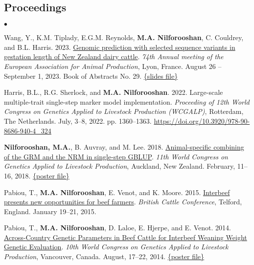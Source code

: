 \documentclass[margin,line]{res}
\newenvironment{list2}{
  \begin{list}{$\bullet$}{%
    \setlength{\itemsep}{0in}
    \setlength{\parsep}{0in} \setlength{\parskip}{0in}
    \setlength{\topsep}{0in} \setlength{\partopsep}{0in}
    \setlength{\leftmargin}{0.2in}}}
  {\end{list}}
\begin{document}
\begin{resume}
  \section{\sc Proceedings}

  \begin{list2}
    \item Wang, Y., K.M. Tiplady, E.G.M. Reynolds, {\bf M.A. Nilforooshan}, C. Couldrey, and B.L. Harris. 2023. \href{https://drive.google.com/file/d/17ExrxN3UtOX0vTlLfaMWlFZFQsiIqMQ6/view?usp=sharing}{Genomic prediction with selected sequence variants in gestation length of New Zealand dairy cattle}. {\em 74th Annual meeting of the European Association for Animal Production}, Lyon, France. August 26 -- September 1, 2023. Book of Abstracts No. 29. \href{https://interbull.org/static/web/WANG_Y_20230828_0830_Tete_d_or_Lounge.pdf}{\{slides file\}}
    \item Harris, B.L., R.G. Sherlock, and {\bf M.A. Nilforooshan}. 2022. Large-scale multiple-trait single-step marker model implementation. {\em Proceeding of 12th World Congress on Genetics Applied to Livestock Production (WCGALP)}, Rotterdam, The Netherlands. July, 3--8, 2022. pp. 1360--1363. \url{https://doi.org/10.3920/978-90-8686-940-4_324}
    \item {\bf Nilforooshan, M.A.}, B. Auvray, and M. Lee. 2018. \href{https://www.researchgate.net/publication/358198782_Animal-specific_combining_of_the_GRM_and_the_NRM_in_single-step_GBLUP}{Animal-specific combining of the GRM and the NRM in single-step GBLUP}. {\em 11th World Congress on Genetics Applied to Livestock Production}, Auckland, New Zealand. February, 11--16, 2018. \href{https://doi.org/10.13140/RG.2.2.25768.03843}{\{poster file\}}
    \item Pabiou, T., {\bf M.A. Nilforooshan}, E. Venot, and  K. Moore. 2015. \href{https://www.researchgate.net/publication/358198790_Interbeef_presents_new_opportunities_for_beef_farmers}{Interbeef presents new opportunities for beef farmers}. {\em British Cattle Conference}, Telford, England. January 19--21, 2015.
    \item Pabiou, T., {\bf M.A. Nilforooshan}, D. Laloe, E. Hjerpe, and E. Venot. 2014. \href{https://www.researchgate.net/publication/268110020_ACROSS-COUNTRY_GENETIC_PARAMETERS_IN_BEEF_CATTLE_FOR_INTERBEEF_WEANING_WEIGHT_GENETIC_EVALUATION}{Across-Country Genetic Parameters in Beef Cattle for Interbeef Weaning Weight Genetic Evaluation}. {\em 10th World Congress on Genetics Applied to Livestock Production}, Vancouver, Canada. August, 17--22, 2014. \href{http://dx.doi.org/10.13140/RG.2.2.33036.80003}{\{poster file\}}

\end{list2}
\end{resume}
\end{document}
